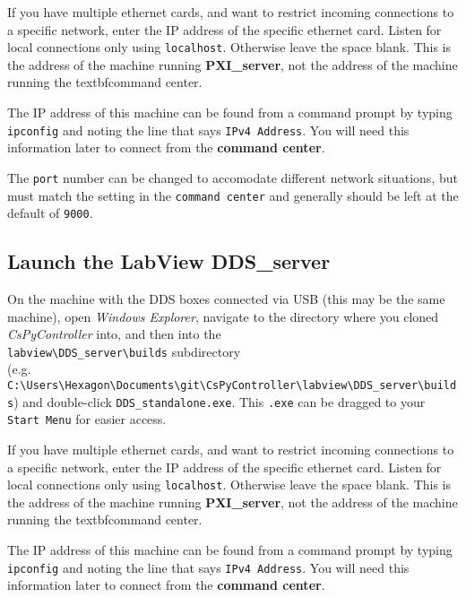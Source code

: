 \documentclass[pdftex,11pt,letterpaper]{article}
\begin{document}
If you have multiple ethernet cards, and want to restrict incoming connections to a specific network, enter the IP address of the specific ethernet card.  Listen for local connections only using \texttt{localhost}.  Otherwise leave the space blank.  This is the address of the machine running \textbf{PXI\_server}, not the address of the machine running the textbf{command center}.

The IP address of this machine can be found from a command prompt by typing \texttt{ipconfig} and noting the line that says \texttt{IPv4 Address}.  You will need this information later to connect from the \textbf{command center}.

The \texttt{port} number can be changed to accomodate different network situations, but must match the setting in the \texttt{command center} and generally should be left at the default of \texttt{9000}.

\subsection{Launch the LabView \textbf{DDS\_server}}

On the machine with the DDS boxes connected via USB (this may be the same machine), open \textit{Windows Explorer}, navigate to the directory where you cloned \textit{CsPyController} into, and then into the\\ \texttt{labview\textbackslash DDS\_server\textbackslash builds} subdirectory\\ (e.g. \texttt{C:\textbackslash Users\textbackslash Hexagon\textbackslash Documents\textbackslash git\textbackslash CsPyController\textbackslash labview\textbackslash DDS\_server\textbackslash builds}) and double-click \texttt{DDS\_standalone.exe}.  This \texttt{.exe} can be dragged to your \texttt{Start Menu} for easier access.

If you have multiple ethernet cards, and want to restrict incoming connections to a specific network, enter the IP address of the specific ethernet card.  Listen for local connections only using \texttt{localhost}.  Otherwise leave the space blank.  This is the address of the machine running \textbf{PXI\_server}, not the address of the machine running the textbf{command center}.

The IP address of this machine can be found from a command prompt by typing \texttt{ipconfig} and noting the line that says \texttt{IPv4 Address}.  You will need this information later to connect from the \textbf{command center}.
\end{document}
